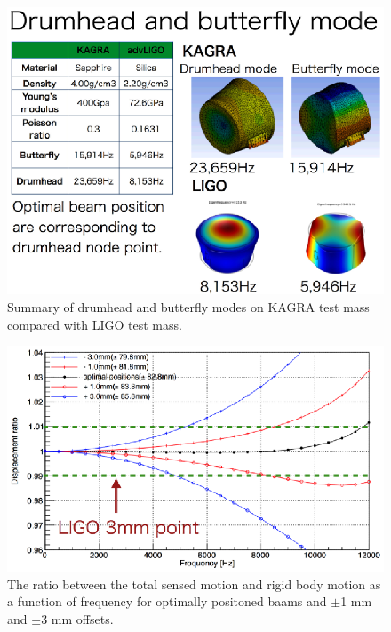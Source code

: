 \begin{figure}
\begin{center}
\includegraphics[width=14cm]{Figures/elmodes.eps}
\caption{Summary of drumhead and butterfly modes on KAGRA test mass 
compared with LIGO test mass.~\cite{Daveloza}} 
\label{fig:elmodes} 
\end{center}
\end{figure}

\begin{figure}
\begin{center}
\includegraphics[width=14cm]{Figures/edeform.eps}
\caption{The ratio between the total sensed motion and rigid body motion 
as a function of frequency for optimally positoned baams and 
$\pm$1 mm and $\pm$3 mm offsets.} 
\label{fig:edeform} 
\end{center}
\end{figure}

